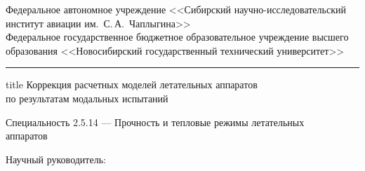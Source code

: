 
{
	\centering
	Федеральное автономное учреждение <<Сибирский научно-исследовательский \\ институт авиации им.~С.\,А.~Чаплыгина>> \\
	Федеральное государственное бюджетное образовательное учреждение высшего образования <<Новосибирский государственный технический университет>> \\
	\par
	\rule{\linewidth}{0.5pt}
	\centering
	\vfill
	\insertauthor\par
	\vfill
	\begin{beamercolorbox}[sep=8pt, center]{title}
		Коррекция расчетных моделей летательных аппаратов \\ по результатам модальных испытаний
		\par%
    \end{beamercolorbox}%
	\vfill
	Специальность 2.5.14 --- Прочность и тепловые режимы летательных \\ \hspace{-4.5em} аппаратов	
	\par
	\vfill
	\begin{flushright}
		Научный руководитель: \\
		\supervisorRegalia \\
		\supervisorFio
	\end{flushright}
    \vfill
    \insertdate\par
    {\inserttitlegraphic\par}
}

\institute{\thesisFirstOrganization\newline\thesisSecondOrganization}
\author{\thesisAuthor}
\title{\thesisTitle}
\subtitle{Специальность \thesisSpecialtyNumber~---~\thesisSpecialtyTitle}
\date{\thesisCity, \thesisYear}